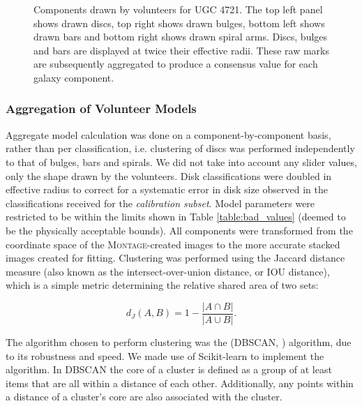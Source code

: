 \documentclass[trackchanges]{aastex63}
\begin{document}
\begin{figure*}
  \caption{Components drawn by volunteers for UGC 4721. The top left panel shows drawn discs, top right shows drawn bulges, bottom left shows drawn bars and bottom right shows drawn spiral arms. Discs, bulges and bars are displayed at twice their effective radii. These raw marks are subsequently aggregated to produce a consensus value for each galaxy component.}
  \label{fig:drawn_shapes}
\end{figure*}


\subsubsection{Aggregation of Volunteer Models}
\label{sec:aggregation_of_volunteer_models}

Aggregate model calculation was done on a component-by-component basis, rather than per classification, i.e. clustering of discs was performed independently to that of bulges, bars and spirals. We did not take into account any slider values, only the shape drawn by the volunteers. Disk classifications were doubled in effective radius to correct for a systematic error in disk size observed in the classifications received for the \textit{calibration subset}. Model parameters were restricted to be within the limits shown in Table \ref{table:bad_values} (deemed to be the physically acceptable bounds). All components were transformed from the coordinate space of the \textsc{Montage}-created images to the more accurate stacked images created for fitting. Clustering was performed using the Jaccard distance measure (also known as the intersect-over-union distance, or IOU distance), which is a simple metric determining the relative shared area of two sets:

\begin{equation}
d_J(A, B) = 1 - \frac{|A \cap B|}{|A \cup B|}.
\end{equation}

The algorithm chosen to perform clustering was the  (DBSCAN, \citealt{dbscan}) algorithm, due to its robustness and speed. We made use of Scikit-learn \citep{scikit-learn} to implement the algorithm. In DBSCAN the core of a cluster is defined as a group of at least  items that are all within a distance  of each other. Additionally, any points within a distance  of a cluster's core are also associated with the cluster.
\end{document}

